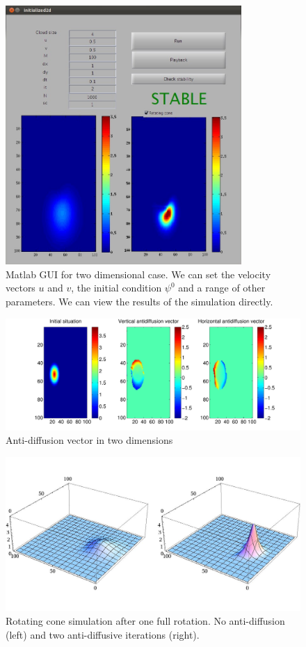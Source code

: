 \documentclass[10pt, a4paper]{article}
\begin{document}
\begin{figure}
\centering
 \includegraphics[width=0.8\textwidth]{2dscreenshot.jpg}
 \caption{Matlab GUI for two dimensional case. We can set the velocity vectors $u$ and $v$, the initial condition $\psi^0$ and a range of other parameters. We can view the results of the simulation directly.}
 \label{fig:2dgui}
\end{figure}

\begin{figure}
\centering
 \includegraphics[width=\textwidth]{../presentation/ad2d.pdf}
\caption{Anti-diffusion vector in two dimensions}
\label{fig:antivec2d}
\end{figure}


\begin{figure}
\centering
 \includegraphics[width=\textwidth]{../presentation/animation2/anim-64}
\caption{Rotating cone simulation after one full rotation. No anti-diffusion (left) and two anti-diffusive iterations (right).}
\label{fig:rotcone}
\end{figure}
\end{document}
